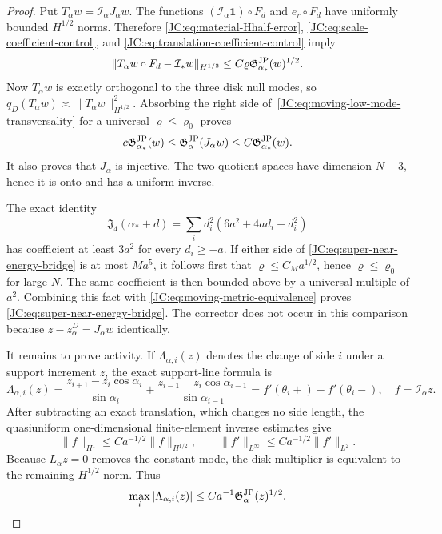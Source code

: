 \documentclass[11pt]{amsart}
\numberwithin{equation}{section}
\theoremstyle{definition}
\theoremstyle{remark}
\newcommand{\Jfour}{\mathfrak J_4}
\newcommand{\Gjp}{\mathfrak G^{\rm JP}}
\begin{document}
\begin{proof}
Put $T_\alpha w=\mathcal I_\alpha J_\alpha w$.  The functions
$(\mathcal I_\alpha\mathbf1)\circ F_d$ and $e_r\circ F_d$ have uniformly
bounded $H^{1/2}$ norms.  Therefore
\eqref{JC:eq:material-Hhalf-error},
\eqref{JC:eq:scale-coefficient-control}, and
\eqref{JC:eq:translation-coefficient-control} imply
\begin{equation}\label{JC:eq:moving-low-mode-transversality}
 \|T_\alpha w\circ F_d-\mathcal I_*w\|_{H^{1/2}}
 \le C\varrho\Gjp_{\alpha_*}(w)^{1/2}.
\end{equation}
Now $T_\alpha w$ is exactly orthogonal to the three disk null modes, so
$q_D(T_\alpha w)\asymp\|T_\alpha w\|_{H^{1/2}}^2$.  Absorbing the right
side of~\eqref{JC:eq:moving-low-mode-transversality} for a universal
$\varrho\le\varrho_0$ proves
\begin{equation}\label{JC:eq:moving-metric-equivalence}
 c\Gjp_{\alpha_*}(w)\le
 \Gjp_\alpha(J_\alpha w)\le C\Gjp_{\alpha_*}(w).
\end{equation}
It also proves that $J_\alpha$ is injective.  The two quotient spaces
have dimension $N-3$, hence it is onto and has a uniform inverse.

The exact identity
\[
 \Jfour(\alpha_*+d)
 =\sum_i d_i^2(6a^2+4ad_i+d_i^2)
\]
has coefficient at least $3a^2$ for every $d_i\ge-a$.  If either side of
\eqref{JC:eq:super-near-energy-bridge} is at most $Ma^5$, it follows first
that $\varrho\le C_Ma^{1/2}$, hence $\varrho\le\varrho_0$ for large $N$.
The same coefficient is then bounded above by a universal multiple of
$a^2$.  Combining this fact with
\eqref{JC:eq:moving-metric-equivalence} proves
\eqref{JC:eq:super-near-energy-bridge}.  The corrector does not occur in
this comparison because $z-z_\alpha^D=J_\alpha w$ identically.

It remains to prove activity.  If $\Lambda_{\alpha,i}(z)$ denotes the
change of side $i$ under a support increment $z$, the exact support-line
formula is
\begin{equation}\label{JC:eq:exact-side-length-jump}
 \Lambda_{\alpha,i}(z)=
 \frac{z_{i+1}-z_i\cos\alpha_i}{\sin\alpha_i}
 +\frac{z_{i-1}-z_i\cos\alpha_{i-1}}{\sin\alpha_{i-1}}
 =f'(\theta_i+)-f'(\theta_i-),
 \quad f=\mathcal I_\alpha z.
\end{equation}
After subtracting an exact translation, which changes no side length,
the quasiuniform one-dimensional finite-element inverse estimates give
\[
 \|f\|_{H^1}\le Ca^{-1/2}\|f\|_{H^{1/2}},
 \qquad
 \|f'\|_{L^\infty}\le Ca^{-1/2}\|f'\|_{L^2}.
\]
Because $L_\alpha z=0$ removes the constant mode, the disk multiplier is
equivalent to the remaining $H^{1/2}$ norm.  Thus
\begin{equation}\label{JC:eq:side-length-inverse}
 \max_i|\Lambda_{\alpha,i}(z)|
 \le Ca^{-1}\Gjp_\alpha(z)^{1/2}.
\end{equation}


\end{proof}
\end{document}
